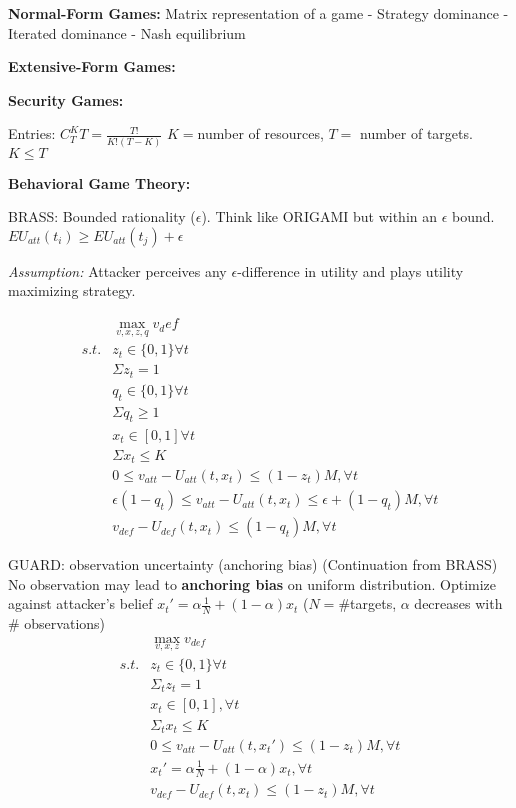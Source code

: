 \documentclass[12pt,letter]{article}
\begin{document}
\begin{multicols}{2}
\textbf{Normal-Form Games:} Matrix representation of a game
- Strategy dominance
- Iterated dominance
- Nash equilibrium

\textbf{Extensive-Form Games:}

\textbf{Security Games:}

Entries: $C_T^KT=\frac{T!}{K!(T-K)}$ $K=$number of resources, $T=$ number of targets. 
$K\leq T$

\textbf{Behavioral Game Theory:}

BRASS: Bounded rationality ($\epsilon$). Think like ORIGAMI but within an
$\epsilon$ bound. $EU_{att}(t_i) \geq EU_{att}(t_j) + \epsilon$

\textit{Assumption:} Attacker perceives any $\epsilon$-difference in utility and
plays utility maximizing strategy.

\begin{align*}
    &\max_{v,x,z,q}v_def\\
    s.t.&z_t\in\{0,1\}\forall t\\
    &\Sigma z_t = 1\\
    &q_t\in\{0,1\}\forall t\\
    &\Sigma q_t\geq 1\\
    &x_t\in[0,1]\forall t\\
    &\Sigma x_t\leq K\\
    &0\leq v_{att}-U_{att}(t,x_t)\leq(1-z_t)M,\forall t\\
    &\epsilon(1-q_t)\leq v_{att} - U_{att}(t,x_t)\leq\epsilon + (1-q_t)M,\forall t\\
    &v_{def} - U_{def}(t,x_t)\leq(1-q_t)M,\forall t
\end{align*}

GUARD: observation uncertainty (anchoring bias) (Continuation from BRASS)
No observation may lead to \textbf{anchoring bias} on uniform distribution.
Optimize against attacker's belief $x_t'=\alpha\frac{1}{N}+(1-\alpha)x_t$ 
($N=$\#targets, $\alpha$ decreases with \# observations)
\begin{align*}
    &\max_{v,x,z} v_{def}\\
    s.t.& z_t\in\{0,1\}\forall t\\
    &\Sigma_t z_t = 1\\
    &x_t \in [0,1], \forall t\\
    &\Sigma_t x_t \leq K\\
    &0\leq v_{att} - U_{att}(t,x_t')\leq (1-z_t) M,\forall t\\
    &x_t' = \alpha \frac1N + (1-\alpha) x_t, \forall t\\
    &v_{def} - U_{def}(t,x_t) \leq (1-z_t) M, \forall t
\end{align*}


\end{multicols}
\end{document}
